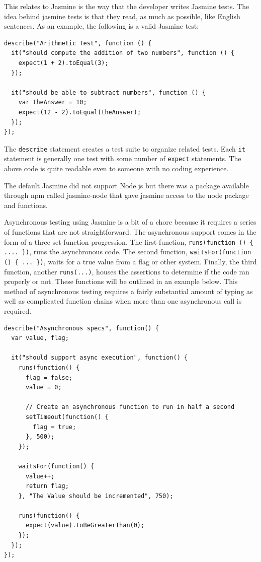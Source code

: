\documentclass[12pt]{ucthesis}
\begin{document}
This relates to Jasmine is the way that the developer writes Jasmine tests. The idea behind jasmine tests is that they read, as much as possible, like English sentences. As an example, the following is a valid Jasmine test:
\begin{lstlisting}
describe("Arithmetic Test", function () {
  it("should compute the addition of two numbers", function () {
    expect(1 + 2).toEqual(3);
  });

  it("should be able to subtract numbers", function () {
    var theAnswer = 10;
    expect(12 - 2).toEqual(theAnswer);
  });
});
\end{lstlisting}
The \lstinline{describe} statement creates a test suite to organize related tests. Each \lstinline{it} statement is generally one test with some number of \lstinline{expect} statements. The above code is quite readable even to someone with no coding experience.

The default Jasmine did not support Node.js but there was a package available through npm called jasmine-node\cite{JasmineNode} that gave jasmine access to the node package and functions. 

Asynchronous testing using Jasmine is a bit of a chore because it requires a series of functions that are not straightforward. The asynchronous support comes in the form of a three-set function progression. The first function, \lstinline!runs(function () { .... })!, runs the asynchronous code. The second function, \lstinline!waitsFor(function () { ... })!, waits for a true value from a flag or other system. Finally, the third function, another \lstinline{runs(...)}, houses the assertions to determine if the code ran properly or not. These functions will be outlined in an example below. This method of asynchronous testing requires a fairly substantial amount of typing as well as complicated function chains when more than one asynchronous call is required.

\begin{lstlisting}
describe("Asynchronous specs", function() {
  var value, flag;

  it("should support async execution", function() {
    runs(function() {
      flag = false;
      value = 0;

      // Create an asynchronous function to run in half a second
      setTimeout(function() {
        flag = true;
      }, 500);
    });

    waitsFor(function() {
      value++;
      return flag;
    }, "The Value should be incremented", 750);

    runs(function() {
      expect(value).toBeGreaterThan(0);
    });
  });
});
\end{lstlisting}
\end{document}
